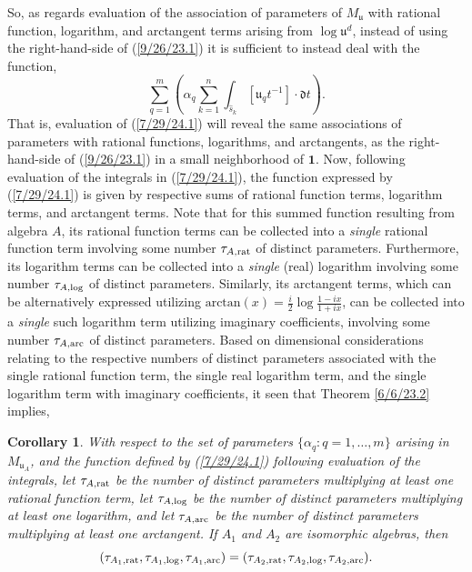 \documentclass{amsart}
\numberwithin{equation}{section}
\newtheorem{corollary}[theorem]{Corollary}
\theoremstyle{definition}
\numberwithin{theorem}{section}
\begin{document}
So, as regards evaluation of the association of parameters of $M_{\mathfrak{u}}$ with rational function, logarithm, and arctangent terms arising from $\log\mathfrak{u}^d$, instead of using the right-hand-side of (\ref{9/26/23.1}) it is sufficient to instead deal with the function,
\begin{equation}\label{7/29/24.1} \sum_{q=1}^m \left(\alpha_q\sum_{k=1}^n \int_{\hat{s}_k} [\mathfrak{u}_q t^{-1}]\cdot \mathfrak{d}t\right).\end{equation} That is, evaluation of (\ref{7/29/24.1}) will reveal the same associations of parameters with rational functions, logarithms, and arctangents, as the right-hand-side of (\ref{9/26/23.1}) in a small neighborhood of $\mathbf{1}$.  Now, following evaluation of the integrals in (\ref{7/29/24.1}), the function expressed by (\ref{7/29/24.1}) is given by respective sums of rational function terms, logarithm terms, and arctangent terms.  Note that for this summed function resulting from algebra $A$, its rational function terms can be collected into a {\it single} rational function term involving some number $\tau_{A,{\rm rat}}$ of distinct parameters.  Furthermore, its logarithm terms can be collected into a {\it single} (real) logarithm involving some number $\tau_{A,{\rm log}}$ of distinct parameters.  Similarly, its arctangent terms, which can be alternatively expressed utilizing $\text{arctan}(x) = \frac{i}{2}\log\frac{1-ix}{1+ix}$, can be collected into a {\it single} such logarithm term utilizing imaginary coefficients, involving some number $\tau_{A,{\rm arc}}$ of distinct parameters. 
Based on dimensional considerations relating to the respective numbers of distinct parameters associated with the single rational function term, the single real logarithm term, and the single logarithm term with imaginary coefficients, it seen that Theorem \ref{6/6/23.2} implies,


\begin{corollary}\label{7/25/24.1} With respect to the set of parameters $\{\alpha_q:q=1,\dots,m\}$ arising in $M_{\mathfrak{u}_A}$, and the function defined by (\ref{7/29/24.1}) following evaluation of the integrals, let $\tau_{A,{\rm rat}}$ be the number of distinct parameters multiplying at least one rational function term, let $\tau_{A,{\rm log}}$ be the number of distinct parameters multiplying at least one logarithm, and let $\tau_{A,{\rm arc}}$ be the number of distinct parameters multiplying at least one arctangent.  If $A_1$ and $A_2$ are isomorphic algebras, then \[ (\tau_{A_1,{\rm rat}},\tau_{A_1,{\rm log}},\tau_{A_1,{\rm arc}}) = (\tau_{A_2,{\rm rat}},\tau_{A_2,{\rm log}},\tau_{A_2,{\rm arc}}).\]
\end{corollary}
\end{document}

